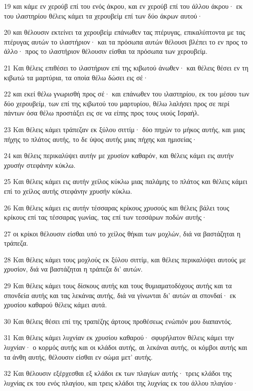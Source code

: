 \par 19 και κάμε εν χερούβ επί του ενός άκρου, και εν χερούβ επί του άλλου άκρου· εκ του ιλαστηρίου θέλεις κάμει τα χερουβείμ επί των δύο άκρων αυτού·
\par 20 και θέλουσιν εκτείνει τα χερουβείμ επάνωθεν τας πτέρυγας, επικαλύπτοντα με τας πτέρυγας αυτών το ιλαστήριον· και τα πρόσωπα αυτών θέλουσι βλέπει το εν προς το άλλο· προς το ιλαστήριον θέλουσιν είσθαι τα πρόσωπα των χερουβείμ.
\par 21 Και θέλεις επιθέσει το ιλαστήριον επί της κιβωτού άνωθεν· και θέλεις θέσει εν τη κιβωτώ τα μαρτύρια, τα οποία θέλω δώσει εις σέ·
\par 22 και εκεί θέλω γνωρισθή προς σέ· και επάνωθεν του ιλαστηρίου, εκ του μέσου των δύο χερουβείμ, των επί της κιβωτού του μαρτυρίου, θέλω λαλήσει προς σε περί πάντων όσα θέλω προστάξει εις σε να είπης προς τους υιούς Ισραήλ.
\par 23 Και θέλεις κάμει τράπεζαν εκ ξύλου σιττίμ· δύο πηχών το μήκος αυτής, και μιας πήχης το πλάτος αυτής, το δε ύψος αυτής μιας πήχης και ημισείας·
\par 24 και θέλεις περικαλύψει αυτήν με χρυσίον καθαρόν, και θέλεις κάμει εις αυτήν χρυσήν στεφάνην κύκλω.
\par 25 Και θέλεις κάμει εις αυτήν χείλος κύκλω μιας παλάμης το πλάτος και θέλεις κάμει επί το χείλος αυτής στεφάνην χρυσήν κύκλω.
\par 26 Και θέλεις κάμει εις αυτήν τέσσαρας κρίκους χρυσούς και θέλεις βάλει τους κρίκους επί τας τέσσαρας γωνίας, τας επί των τεσσάρων ποδών αυτής·
\par 27 οι κρίκοι θέλουσιν είσθαι υπό το χείλος θήκαι των μοχλών, διά να βαστάζηται η τράπεζα.
\par 28 Και θέλεις κάμει τους μοχλούς εκ ξύλου σιττίμ, και θέλεις περικαλύψει αυτούς με χρυσίον, διά να βαστάζηται η τράπεζα δι' αυτών.
\par 29 Και θέλεις κάμει τους δίσκους αυτής και τους θυμιαματοδόχους αυτής και τα σπονδεία αυτής και τας λεκάνας αυτής, διά να γίνωνται δι' αυτών αι σπονδαί· εκ χρυσίου καθαρού θέλεις κάμει αυτά.
\par 30 Και θέλεις θέσει επί της τραπέζης άρτους προθέσεως ενώπιόν μου διαπαντός.
\par 31 Και θέλεις κάμει λυχνίαν εκ χρυσίου καθαρού· σφυρήλατον θέλεις κάμει την λυχνίαν· ο κορμός αυτής και οι κλάδοι αυτής, αι λεκάναι αυτής, οι κόμβοι αυτής και τα άνθη αυτής, θέλουσιν είσθαι εν σώμα μετ' αυτής.
\par 32 Και θέλουσιν εξέρχεσθαι εξ κλάδοι εκ των πλαγίων αυτής· τρεις κλάδοι της λυχνίας εκ του ενός πλαγίου, και τρεις κλάδοι της λυχνίας εκ του άλλου πλαγίου·

